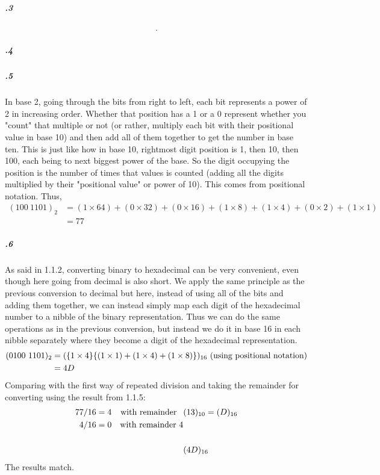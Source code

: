 \documentclass[11pt,letterpaper]{article}
\begin{document}
		\subparagraph{.3}
		\begin{align*}
		.
		\end{align*}
		
		
		\subparagraph{.4}
		
		\subparagraph{.5}
		In base 2, going through the bits from right to left, each bit represents a power of 2 in increasing order. Whether that position has a 1 or a 0 represent whether you "count" that multiple or not (or rather, multiply each bit with their positional value in base 10) and then add all of them together to get the number in base ten. This is just like how in base 10, rightmost digit position is 1, then 10, then 100, each being to next biggest power of the base. So the digit occupying the position is the number of times that values is counted (adding all the digits multiplied by their "positional value" or power of 10). This comes from positional notation.
		Thus,
		\begin{align*}
		(100\ 1101)_2 &= (1 \times 64) + (0 \times 32) + (0 \times 16) + (1 \times 8) + (1 \times 4) + (0 \times 2) + (1 \times 1)\\
		&= 77
		\end{align*}
		
		\subparagraph{.6}
		As said in 1.1.2, converting binary to hexadecimal can be very convenient, even though here going from decimal is also short. We apply the same principle as the previous conversion to decimal but here, instead of using all of the bits and adding them together, we can instead simply map each digit of the hexadecimal number to a nibble of the binary representation. Thus we can do the same operations as in the previous conversion, but instead we do it in base 16 in each nibble separately where they become a digit of the hexadecimal representation.
		\begin{align*}
		(0100\ 1101)_2 &= (\{1 \times 4\}\{(1 \times 1) + (1 \times 4) + (1 \times 8)\})_{16}\textnormal{ (using positional notation)}\\
		&= 4D
		\end{align*}
		Comparing with the first way of repeated division and taking the remainder for converting using the result from 1.1.5:
		\begin{align*}
		77 / 16 &= 4&\textnormal{with remainder\;\;\:}&(13)_{10} = (D)_{16}\\
		 4 / 16 &= 0&\textnormal{with remainder 4}&\\
		\\
		&&&(4D)_{16}
		\end{align*}
		The results match.
		
\end{document}
